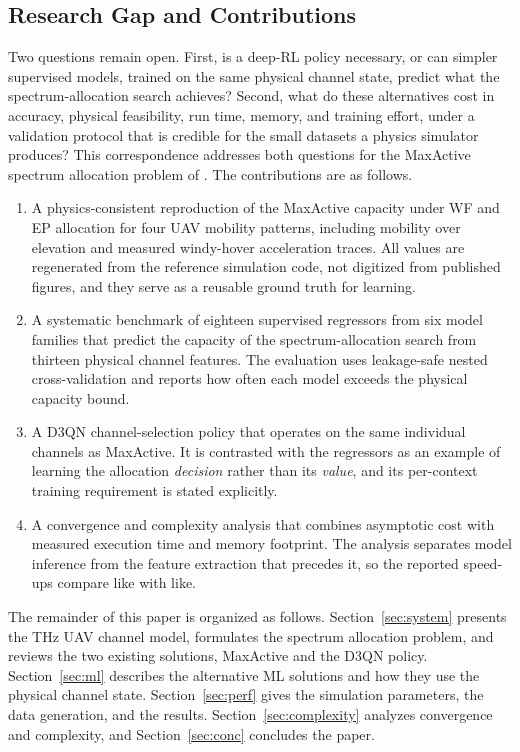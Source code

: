 \documentclass[correspondence]{IEEEtaes}
\begin{document}
\subsection{Research Gap and Contributions}
Two questions remain open. First, is a deep-RL policy necessary, or can simpler
supervised models, trained on the same physical channel state, predict what the
spectrum-allocation search achieves? Second, what do these alternatives cost in
accuracy, physical feasibility, run time, memory, and training effort, under a
validation protocol that is credible for the small datasets a physics simulator
produces? This correspondence addresses both questions for the MaxActive spectrum
allocation problem of \cite{saeed2024maxactive}. The contributions are as follows.
\begin{enumerate}
\def\labelenumi{\arabic{enumi})}
\item A physics-consistent reproduction of the MaxActive capacity under WF and EP
allocation for four UAV mobility patterns, including mobility over elevation and
measured windy-hover acceleration traces. All values are regenerated from the reference
simulation code, not digitized from published figures, and they serve as a reusable
ground truth for learning.
\item A systematic benchmark of eighteen supervised regressors from six model families
that predict the capacity of the spectrum-allocation search from thirteen physical
channel features. The evaluation uses leakage-safe nested cross-validation and reports
how often each model exceeds the physical capacity bound.
\item A D3QN channel-selection policy that operates on the same individual channels as
MaxActive. It is contrasted with the regressors as an example of learning the
allocation \emph{decision} rather than its \emph{value}, and its per-context training
requirement is stated explicitly.
\item A convergence and complexity analysis that combines asymptotic cost with measured
execution time and memory footprint. The analysis separates model inference from the
feature extraction that precedes it, so the reported speed-ups compare like with like.
\end{enumerate}

The remainder of this paper is organized as follows. Section~\ref{sec:system} presents
the THz UAV channel model, formulates the spectrum allocation problem, and reviews the
two existing solutions, MaxActive and the D3QN policy. Section~\ref{sec:ml} describes the
alternative ML solutions and how they use the physical channel state.
Section~\ref{sec:perf} gives the simulation parameters, the data generation, and the
results. Section~\ref{sec:complexity} analyzes convergence and complexity, and
Section~\ref{sec:conc} concludes the paper.
\end{document}
